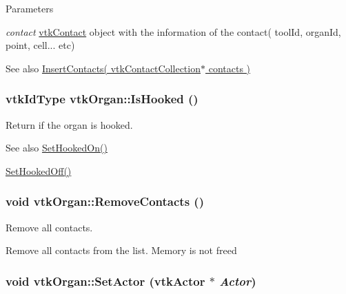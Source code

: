\begin{DoxyParams}{Parameters}
\item[{\em contact}]\hyperlink{classvtkContact}{vtkContact} object with the information of the contact( toolId, organId, point, cell... etc) \end{DoxyParams}
\begin{DoxySeeAlso}{See also}
\hyperlink{classvtkOrgan_aa61c5704ac5458ee9e5bfa6aed6014ce}{InsertContacts( vtkContactCollection$\ast$ contacts )} 
\end{DoxySeeAlso}
\hypertarget{classvtkOrgan_ad61305759deba9189e2a648c9d083fac}{
\subsubsection[{IsHooked}]{\setlength{\rightskip}{0pt plus 5cm}vtkIdType vtkOrgan::IsHooked ()}}
\label{classvtkOrgan_ad61305759deba9189e2a648c9d083fac}


Return if the organ is hooked. 

\begin{DoxySeeAlso}{See also}
\hyperlink{classvtkOrgan_a78a3cdaeb7e6b23de0880dcb1c407cfe}{SetHookedOn()} 

\hyperlink{classvtkOrgan_ad2ac78a6020fba61ff49edad8a3f6a22}{SetHookedOff()} 
\end{DoxySeeAlso}
\hypertarget{classvtkOrgan_abd019445a21886d765aec818b90add63}{
\subsubsection[{RemoveContacts}]{\setlength{\rightskip}{0pt plus 5cm}void vtkOrgan::RemoveContacts ()}}
\label{classvtkOrgan_abd019445a21886d765aec818b90add63}


Remove all contacts. 

Remove all contacts from the list. Memory is not freed \hypertarget{classvtkOrgan_a7368fa68add5a80b7b80989df1894233}{
\subsubsection[{SetActor}]{\setlength{\rightskip}{0pt plus 5cm}void vtkOrgan::SetActor (vtkActor $\ast$ {\em Actor})}}
\label{classvtkOrgan_a7368fa68add5a80b7b80989df1894233}


